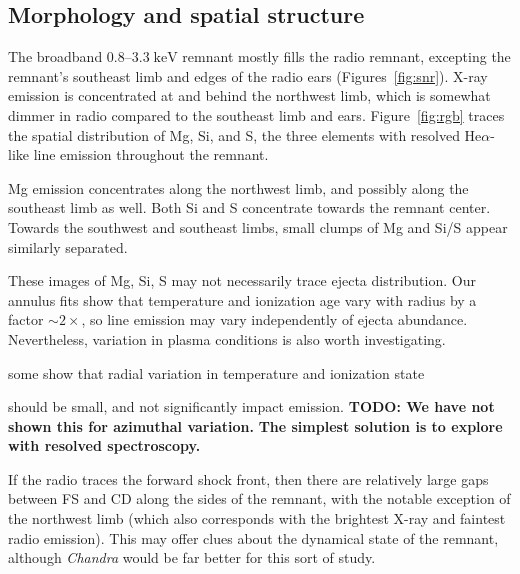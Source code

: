 \documentclass[preprint2,tighten,trackchanges]{aastex6}
\newcommand*{\mt}{\mathrm}
\newcommand*{\unit}[1]{\;\mt{#1}}  %
\newcommand*{\abt}{\mathord{\sim}} %
\begin{document}
\subsection{Morphology and spatial structure}

The broadband $0.8$--$3.3 \unit{keV}$ remnant mostly fills the radio remnant,
excepting the remnant's southeast limb and edges of the radio ears
(Figures~\ref{fig:snr}).
X-ray emission is concentrated at and behind the northwest limb, which is
somewhat dimmer in radio compared to the southeast limb and ears.
Figure~\ref{fig:rgb} traces the spatial distribution of Mg, Si, and S, the
three elements with resolved He$\alpha$-like line emission throughout the
remnant.

Mg emission concentrates along the northwest limb, and possibly along the
southeast limb as well.
Both Si and S concentrate towards the remnant center.
Towards the southwest and southeast limbs, small clumps of Mg and Si/S appear
similarly separated.

These images of Mg, Si, S may not necessarily trace ejecta distribution.
Our annulus fits show that temperature and ionization age vary with radius by a
factor $\abt 2 \times$, so line emission may vary independently of ejecta
abundance.
Nevertheless, variation in plasma conditions is also worth investigating.

some show that radial variation in temperature and ionization state

should be small, and not significantly impact emission.
\textbf{TODO: We have not shown this for azimuthal variation.}
\textbf{The simplest solution is to explore with resolved spectroscopy.}

\begin{figure*}[!ht]
    \label{fig:rgb}
\end{figure*}

If the radio traces the forward shock front, then there are relatively
large gaps between FS and CD along the sides of the remnant, with the
notable exception of the northwest limb (which also corresponds with
the brightest X-ray and faintest radio emission).
This may offer clues about the dynamical state of the remnant, although
\textit{Chandra} would be far better for this sort of study.
\end{document}

